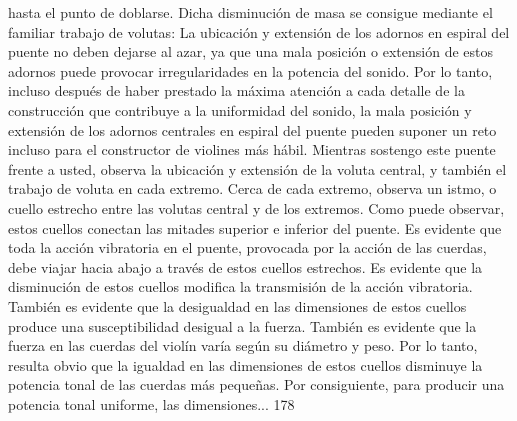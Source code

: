 hasta el punto de doblarse.
Dicha disminución de masa se consigue mediante el familiar trabajo de volutas:
La ubicación y extensión de los adornos en espiral del puente no deben dejarse al azar, ya que una mala posición o extensión de estos adornos puede provocar irregularidades en la potencia del sonido. Por lo tanto, incluso después de haber prestado la máxima atención a cada detalle de la construcción que contribuye a la uniformidad del sonido, la mala posición y extensión de los adornos centrales en espiral del puente pueden suponer un reto incluso para el constructor de violines más hábil.
Mientras sostengo este puente frente a usted, observa la ubicación y extensión de la voluta central, y también el trabajo de voluta en cada extremo. Cerca de cada extremo, observa un istmo, o cuello estrecho entre las volutas central y de los extremos. Como puede observar, estos cuellos conectan las mitades superior e inferior del puente. Es evidente que toda la acción vibratoria en el puente, provocada por la acción de las cuerdas, debe viajar hacia abajo a través de estos cuellos estrechos. Es evidente que la disminución de estos cuellos modifica la transmisión de la acción vibratoria. También es evidente que la desigualdad en las dimensiones de estos cuellos produce una susceptibilidad desigual a la fuerza. También es evidente que la fuerza en las cuerdas del violín varía según su diámetro y peso. Por lo tanto, resulta obvio que la igualdad en las dimensiones de estos cuellos disminuye la potencia tonal de las cuerdas más pequeñas. Por consiguiente, para producir una potencia tonal uniforme, las dimensiones...
178


